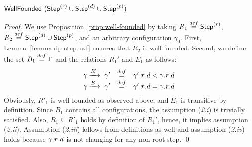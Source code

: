 \begin{theorem}
  $\mathsf{WellFounded}~ (\mathsf{Step}^{(r)} \cup \mathsf{Step}^{(d)} \cup \mathsf{Step}^{(p)})$
\end{theorem}
\begin{proof}
  We use Proposition~\ref{prop:well-founded} by taking
  $R_1 \stackrel{def}= \mathsf{Step}^{(r)}$, $R_2 \stackrel{def}= \mathsf{Step}^{(d)} \cup \mathsf{Step}^{(p)}$, and an
  arbitrary configuration $\gamma_0$.  First,
  Lemma~\ref{lemma:dp-steps:wf} ensures that $R_2$ is
  well-founded.  Second, we define the set $B_1 \stackrel{def}= \Gamma$ and the
  relations $R_1'$ and $E_1$ as follows:
  \[\begin{array}{rcl}
  \gamma \xrightarrow{R'_1} ~\gamma' & \stackrel{def}= & \gamma'.\boldsymbol{r}.d < \gamma.\boldsymbol{r}.d \\
  \gamma \xrightarrow{E_1}  ~\gamma' & \stackrel{def}= & \gamma'.\boldsymbol{r}.d = \gamma.\boldsymbol{r}.d
  \end{array}\]
  Obviously, $R'_1$ is well-founded as observed above, and $E_1$ is
  transitive by definition.  Since $B_1$ contains all configurations,
  the assumption (\textit{2.i}) is trivially satisfied. Also, $R_1
  \subseteq R'_1$ holds by definition of $R_1'$, hence, it implies
  assumption (\textit{2.ii}).  Assumption (\textit{2.iii}) follows from
  definitions as well and assumption (\textit{2.iv}) holds because
  $\gamma.\boldsymbol{r}.d$ is not changing for any non-root step. \qed
\end{proof}




